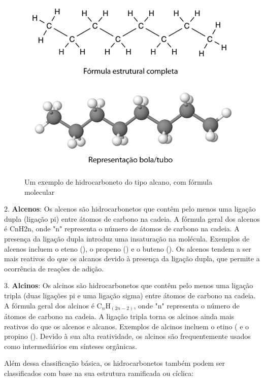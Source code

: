 \documentclass[a4paper,12pt]{book}
\begin{document}
\begin{figure}[h]\centering
\caption{Um exemplo de hidrocarboneto do tipo alcano, com fórmula molecular }
\includegraphics[scale=0.5]{imagens/octano.png}
\label{fig:alcano}\vspace{0.5cm}\end{figure}

2. \textbf{Alcenos}:
Os alcenos são hidrocarbonetos que contêm pelo menos uma ligação dupla (ligação pi) entre átomos de carbono na cadeia. A fórmula geral dos alcenos é CnH2n, onde "n" representa o número de átomos de carbono na cadeia. A presença da ligação dupla introduz uma insaturação na molécula. Exemplos de alcenos incluem o eteno (), o propeno () e o buteno (). Os alcenos tendem a ser mais reativos do que os alcanos devido à presença da ligação dupla, que permite a ocorrência de reações de adição.

3. \textbf{Alcinos}:
Os alcinos são hidrocarbonetos que contêm pelo menos uma ligação tripla (duas ligações pi e uma ligação sigma) entre átomos de carbono na cadeia. A fórmula geral dos alcinos é C{$_n$}H$_{(2n-2)}$, onde "n" representa o número de átomos de carbono na cadeia. A ligação tripla torna os alcinos ainda mais reativos do que os alcenos e alcanos. Exemplos de alcinos incluem o etino ( e o propino (). Devido à sua alta reatividade, os alcinos são frequentemente usados como intermediários em sínteses orgânicas.

Além dessa classificação básica, os hidrocarbonetos também podem ser classificados com base na sua estrutura ramificada ou cíclica:
\end{document}
